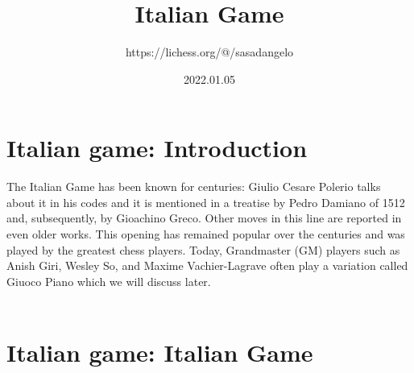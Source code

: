 \documentclass{article}
\title{Italian Game}
\author{https://lichess.org/@/sasadangelo}
\date{2022.01.05}
\begin{document}
\begin{titlepage}
\maketitle
\end{titlepage}
\section{Italian game: Introduction}

The Italian Game has been known for centuries: Giulio Cesare Polerio talks about it in his codes and it is mentioned in a treatise by Pedro Damiano of 1512 and, subsequently, by Gioachino Greco. Other moves in this line are reported in even older works. This opening has remained popular over the centuries and was played by the greatest chess players. Today, Grandmaster (GM) players such as Anish Giri, Wesley So, and Maxime Vachier-Lagrave often play a variation called Giuoco Piano which we will discuss later.\\
\\
\section{Italian game: Italian Game}
\end{document}
